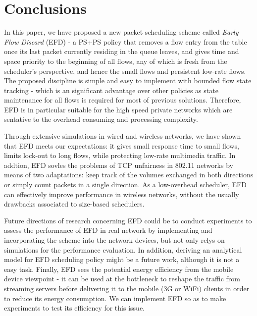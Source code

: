 \documentclass[preprint,12pt]{elsarticle}
\begin{document}
\section{Conclusions}
\label{sec:conclu}
In this paper, we have proposed a new packet scheduling scheme called \textit{Early Flow Discard} (EFD) - a PS+PS policy that removes a flow entry from the table once its last packet currently residing in the queue leaves, and gives time and space priority to the beginning of all flows, any of which is fresh from the scheduler's perspective, and hence the small flows and persistent low-rate flows. The proposed discipline is simple and easy to implement with bounded flow state tracking - which is an significant advantage over other policies as state maintenance for all flows is required for most of previous solutions. Therefore, EFD is in particular suitable for the high speed private networks which are sentative to the overhead consuming and processing complexity. 

Through extensive simulations in wired and wireless networks, we have shown that EFD meets our expectations: it gives small response time to small flows, limits lock-out to long flows, while protecting low-rate multimedia traffic. In addtion, EFD sovles the problems of TCP unfairness in 802.11 networks by means of two adaptations: keep track of the volumes exchanged in both directions or simply count packets in a single direction. As a low-overhead scheduler, EFD can effectively improve performance in wireless networks, without the usually drawbacks associated to size-based schedulers. 

Future directions of research concerning EFD could be to conduct experiments to assess the performance of EFD in real network by implementing and incorporating the scheme into the network devices, but not only relys on simulations for the performance evaluation. In addition, deriving an analytical model for EFD scheduling policy might be a future work, although it is not a easy task. Finally, EFD sees the potential energy efficiency from the mobile device viewpoint - it can be used at the bottleneck to reshape the traffic from streaming servers before delivering it to the mobile (3G or WiFi) clients in order to reduce its energy consumption. We can implement EFD so as to make experiments to test its efficiency for this issue. 


\end{document}
